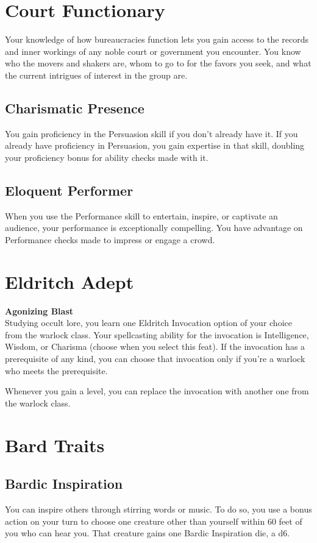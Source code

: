 \documentclass[letterpaper,openany,oneside,twocolumn]{book}
\begin{document}
\section*{Court Functionary}
Your knowledge of how bureaucracies function lets you gain access to the records and inner workings of any noble court or government you encounter. You know who the movers and shakers are, whom to go to for the favors you seek, and what the current intrigues of interest in the group are.
\subsection*{Charismatic Presence}
You gain proficiency in the Persuasion skill if you don't already have it. If you already have proficiency in Persuasion, you gain expertise in that skill, doubling your proficiency bonus for ability checks made with it.
\subsection*{Eloquent Performer}
When you use the Performance skill to entertain, inspire, or captivate an audience, your performance is exceptionally compelling. You have advantage on Performance checks made to impress or engage a crowd.

\section*{Eldritch Adept}
\textbf{Agonizing Blast}\\
Studying occult lore, you learn one Eldritch Invocation option of your choice from the warlock class. Your spellcasting ability for the invocation is Intelligence, Wisdom, or Charisma (choose when you select this feat). If the invocation has a prerequisite of any kind, you can choose that invocation only if you’re a warlock who meets the prerequisite.

Whenever you gain a level, you can replace the invocation with another one from the warlock class.

\section*{Bard Traits}
\subsection*{Bardic Inspiration}
You can inspire others through stirring words or music. To do so, you use a bonus action on your turn to choose one creature other than yourself within 60 feet of you who can hear you. That creature gains one Bardic Inspiration die, a d6.
\end{document}
